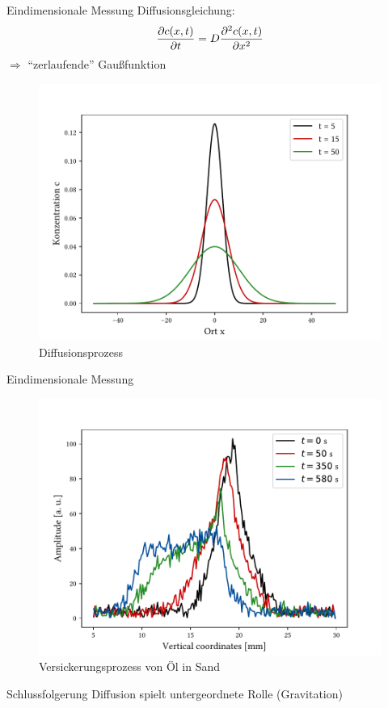 \begin{frame}{Eindimensionale Messung}
Diffusionsgleichung: %
	\begin{align*}
	\pdv{c(x,t)}{t}=D\pdv[2]{c(x,t)}{x}
	\end{align*}
	$\Rightarrow$ \enquote{zerlaufende} Gaußfunktion
	\begin{figure}
	\centering
	\includegraphics[scale=.4]{..//figures//gaus.pdf}
	\caption{Diffusionsprozess}
	\end{figure}
\end{frame}

\begin{frame}{Eindimensionale Messung}
	\begin{figure}
	\centering
	\includegraphics[scale=.35]{..//figures//f61_abb_9.pdf}
	\caption{Versickerungsprozess von Öl in Sand}
	\end{figure}
	\begin{block}{Schlussfolgerung}
	Diffusion spielt untergeordnete Rolle (Gravitation)
	\end{block}
\end{frame}

